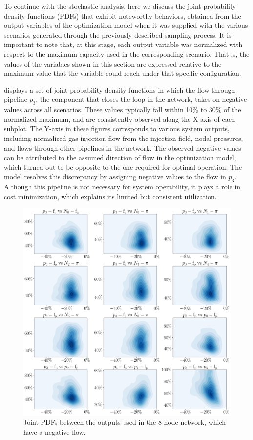  
To continue with the stochastic analysis, here we discuss the joint probability density functions (PDFs) that exhibit noteworthy behaviors, obtained from the output variables of the optimization model when it was supplied with the various scenarios generated through the previously described sampling process. It is important to note that, at this stage, each output variable was normalized with respect to the maximum capacity used in the corresponding scenario. That is, the values of the variables shown in this section are expressed relative to the maximum value that the variable could reach under that specific configuration.


 displays a set of joint probability density functions in which the flow through pipeline $p_3$, the component that closes the loop in the network, takes on negative values across all scenarios. These values typically fall within 10\% to 30\% of the normalized maximum, and are consistently observed along the X-axis of each subplot. The Y-axis in these figures corresponds to various system outputs, including normalized gas injection flow from the injection field, nodal pressures, and flows through other pipelines in the network. The observed negative values can be attributed to the assumed direction of flow in the optimization model, which turned out to be opposite to the one required for optimal operation. The model resolves this discrepancy by assigning negative values to the flow in $p_3$. Although this pipeline is not necessary for system operability, it plays a role in cost minimization, which explains its limited but consistent utilization.


\begin{figure}[H]
    \begin{center}
        \includegraphics[width=.75\textwidth]{figures/Chapter_NonLinealCensnet/outputs_outputs_2.png}
    \end{center}
    \caption{Joint PDFs between the outputs used in the 8-node network, which have a negative flow.}
    \label{fig:joint_distributions_output_output_2}
\end{figure}


